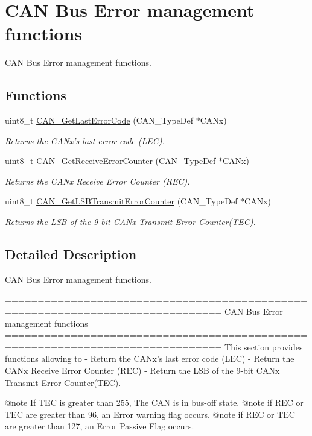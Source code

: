 \hypertarget{group___c_a_n___group5}{\section{C\-A\-N Bus Error management functions}
\label{group___c_a_n___group5}
}


C\-A\-N Bus Error management functions.  


\subsection*{Functions}
\begin{DoxyCompactItemize}
\item 
uint8\-\_\-t \hyperlink{group___c_a_n___group5_gaaee721a392b6b21bfd15dc160aeb6924}{C\-A\-N\-\_\-\-Get\-Last\-Error\-Code} (C\-A\-N\-\_\-\-Type\-Def $\ast$C\-A\-Nx)
\begin{DoxyCompactList}\small\item\em Returns the C\-A\-Nx's last error code (L\-E\-C). \end{DoxyCompactList}\item 
uint8\-\_\-t \hyperlink{group___c_a_n___group5_ga6903eecbec40eb1361d915ddde9a3274}{C\-A\-N\-\_\-\-Get\-Receive\-Error\-Counter} (C\-A\-N\-\_\-\-Type\-Def $\ast$C\-A\-Nx)
\begin{DoxyCompactList}\small\item\em Returns the C\-A\-Nx Receive Error Counter (R\-E\-C). \end{DoxyCompactList}\item 
uint8\-\_\-t \hyperlink{group___c_a_n___group5_ga85ee0c35bf7ca15d4e4c862eef534843}{C\-A\-N\-\_\-\-Get\-L\-S\-B\-Transmit\-Error\-Counter} (C\-A\-N\-\_\-\-Type\-Def $\ast$C\-A\-Nx)
\begin{DoxyCompactList}\small\item\em Returns the L\-S\-B of the 9-\/bit C\-A\-Nx Transmit Error Counter(\-T\-E\-C). \end{DoxyCompactList}\end{DoxyCompactItemize}


\subsection{Detailed Description}
C\-A\-N Bus Error management functions. \begin{DoxyVerb} ===============================================================================
                      CAN Bus Error management functions
 ===============================================================================  
  This section provides functions allowing to 
   -  Return the CANx's last error code (LEC)
   -  Return the CANx Receive Error Counter (REC)
   -  Return the LSB of the 9-bit CANx Transmit Error Counter(TEC).
   
   @note If TEC is greater than 255, The CAN is in bus-off state.
   @note if REC or TEC are greater than 96, an Error warning flag occurs.
   @note if REC or TEC are greater than 127, an Error Passive Flag occurs.\end{DoxyVerb}
 

